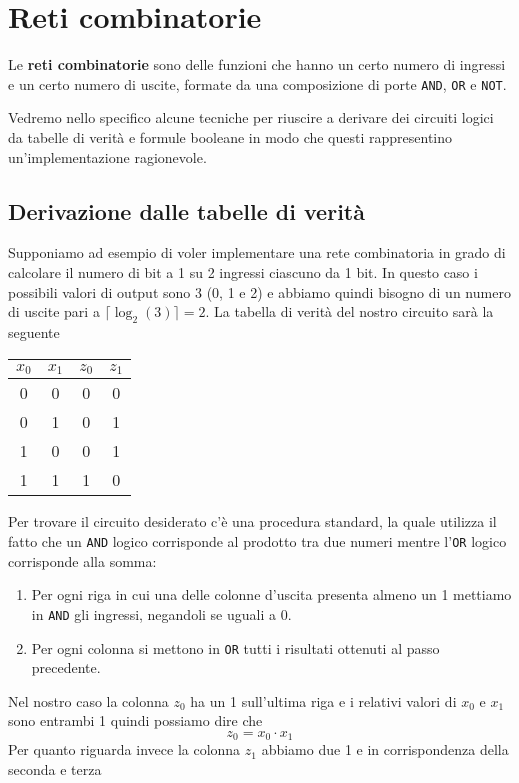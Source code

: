 \chapter{Reti combinatorie}
Le \textbf{reti combinatorie} sono delle funzioni che hanno un certo numero di ingressi e un certo
numero di uscite, formate da una composizione di porte \verb|AND|, \verb|OR| e \verb|NOT|.

Vedremo nello specifico alcune tecniche per riuscire a derivare dei circuiti logici da tabelle di
verità e formule booleane in modo che questi rappresentino un'implementazione ragionevole.

\section{Derivazione dalle tabelle di verità}
Supponiamo ad esempio di voler implementare una rete combinatoria in grado di calcolare il numero
di bit a 1 su 2 ingressi ciascuno da 1 bit. In questo caso i possibili valori di output sono 3 (0,
1 e 2) e abbiamo quindi bisogno di un numero di uscite pari a $\lceil \log_2 (3) \rceil = 2$. La
tabella di verità del nostro circuito sarà la seguente
\begin{center}
	\begin{tabular}{c c | c c}
		$x_0$ & $x_1$ & $z_0$ & $z_1$ \\ \hline
		0     & 0     & 0     & 0     \\
		0     & 1     & 0     & 1     \\
		1     & 0     & 0     & 1     \\
		1     & 1     & 1     & 0
	\end{tabular}
\end{center}
Per trovare il circuito desiderato c'è una procedura standard, la quale utilizza il fatto che un
\verb|AND| logico corrisponde al prodotto tra due numeri mentre l'\verb|OR| logico corrisponde alla
somma:
\begin{enumerate}
	\item Per ogni riga in cui una delle colonne d'uscita presenta almeno un 1 mettiamo in
	      \verb|AND| gli ingressi, negandoli se uguali a 0.
	\item Per ogni colonna si mettono in \verb|OR| tutti i risultati ottenuti al passo precedente.
\end{enumerate}
Nel nostro caso la colonna $z_0$ ha un 1 sull'ultima riga e i relativi valori di $x_0$ e $x_1$ sono
entrambi 1 quindi possiamo dire che
\[ z_0 = x_0 \cdot x_1 \]
Per quanto riguarda invece la colonna $z_1$ abbiamo due 1 e in corrispondenza della seconda e terza
